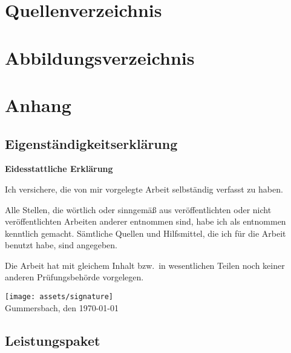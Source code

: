 \appendix

\newpage


\section{Quellenverzeichnis}

\printbibliography


\section{Abbildungsverzeichnis}
\listoffigures

\newpage


\section{Anhang}

\subsection{Eigenständigkeitserklärung}

\textbf{Eidesstattliche Erklärung}

Ich versichere, die von mir vorgelegte Arbeit selbständig verfasst zu haben.

Alle Stellen, die wörtlich oder sinngemäß aus veröffentlichten oder nicht veröffentlichten Arbeiten anderer entnommen sind, habe ich als entnommen kenntlich gemacht.
Sämtliche Quellen und Hilfsmittel, die ich für die Arbeit benutzt habe, sind angegeben.

Die Arbeit hat mit gleichem Inhalt bzw.\ in wesentlichen Teilen noch keiner anderen Prüfungsbehörde vorgelegen.

\texttt{[image: assets/signature]}\\
Gummersbach, den \today

\newpage

\subsection{Leistungspaket}\label{subsec:leistungspaket}
\newpage
{}\newpage
{}\newpage
{}\newpage
{}\newpage
{}\newpage

